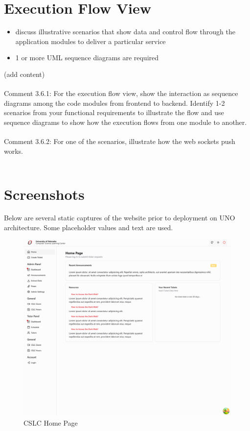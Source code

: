 \documentclass[oneside,openany,obeyspaces]{book}
\newcommand\tab[1][1cm]{\hspace*{#1}}
\begin{document}
\begin{flushleft}
    \section{Execution Flow View}

    \begin{itemize}
        \item discuss illustrative scenarios that show data and control flow through the application modules to deliver a particular service
        \item 1 or more UML sequence diagrams are required
    \end{itemize}

    \tab (add content)\\~\\
    {\color{red}Comment 3.6.1:	For the execution flow view, show the interaction as sequence diagrams among the code modules from frontend to backend. Identify 1-2 scenarios from your functional requirements to illustrate the flow and use sequence diagrams to show how the execution flows from one module to another.  \\~\\}
    {\color{red}Comment 3.6.2: For one of the scenarios, illustrate how the web sockets push works.\\~\\}


    \section{Screenshots}

    \tab Below are several static captures of the website prior to deployment on UNO architecture. Some placeholder values and text are used.

    \begin{figure}
        \centering
        \includegraphics[width=0.75\linewidth]{img/Home Page.png}
        \caption{CSLC Home Page}
        \label{fig:Home Page}
    \end{figure}


\end{flushleft}
\end{document}
